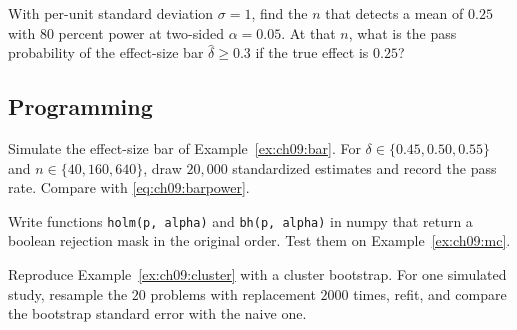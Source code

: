 \begin{exercise}\label{exr:ch09:power}
With per-unit standard deviation $\sigma=1$, find the $n$ that detects a mean of $0.25$ with $80$ percent power at two-sided $\alpha=0.05$. At that $n$, what is the pass probability of the effect-size bar $\hat\delta\ge0.3$ if the true effect is $0.25$?
\end{exercise}

\subsection*{Programming}

\begin{exercise}\label{exr:ch09:simbar}
Simulate the effect-size bar of Example~\ref{ex:ch09:bar}. For $\delta\in\{0.45,0.50,0.55\}$ and $n\in\{40,160,640\}$, draw $20{,}000$ standardized estimates and record the pass rate. Compare with \eqref{eq:ch09:barpower}.
\end{exercise}

\begin{exercise}\label{exr:ch09:mccode}
Write functions \texttt{holm(p, alpha)} and \texttt{bh(p, alpha)} in numpy that return a boolean rejection mask in the original order. Test them on Example~\ref{ex:ch09:mc}.
\end{exercise}

\begin{exercise}\label{exr:ch09:clusterboot}
Reproduce Example~\ref{ex:ch09:cluster} with a cluster bootstrap. For one simulated study, resample the $20$ problems with replacement $2000$ times, refit, and compare the bootstrap standard error with the naive one.
\end{exercise}

\makeatletter\let\sectionmark\omp@savedsectionmark\makeatother

